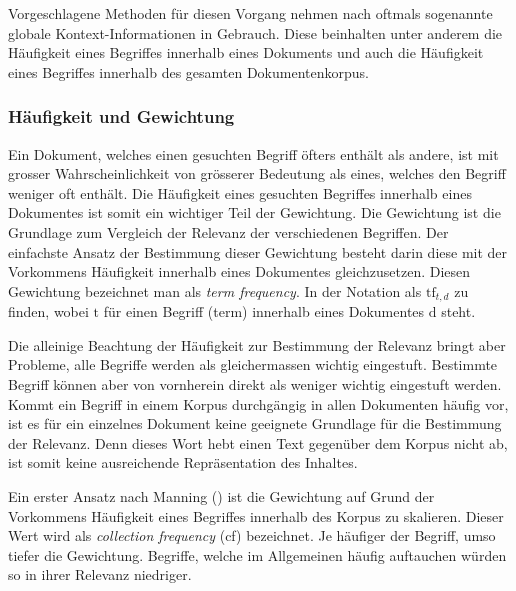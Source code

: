 Vorgeschlagene Methoden für diesen Vorgang nehmen nach \cite[S.~85]{Zhang2006} oftmals sogenannte globale Kontext-Informationen in Gebrauch. Diese beinhalten unter anderem die Häufigkeit eines Begriffes innerhalb eines Dokuments und auch die Häufigkeit eines Begriffes innerhalb des gesamten Dokumentenkorpus. %


\subsubsection{Häufigkeit und Gewichtung}\label{gewichtung}


Ein Dokument, welches einen gesuchten Begriff öfters enthält als andere, ist mit grosser Wahrscheinlichkeit von grösserer Bedeutung als eines, welches den Begriff weniger oft enthält. Die Häufigkeit eines gesuchten Begriffes innerhalb eines Dokumentes ist somit ein wichtiger Teil der Gewichtung. Die Gewichtung ist die Grundlage zum Vergleich der Relevanz der verschiedenen Begriffen. Der einfachste Ansatz der Bestimmung dieser Gewichtung besteht darin diese mit der Vorkommens Häufigkeit innerhalb eines Dokumentes gleichzusetzen. Diesen Gewichtung bezeichnet man als \textit{term frequency}. In der Notation als $\text{tf}_{t,d}$ zu finden, wobei $\text{t}$ für einen Begriff (term) innerhalb eines Dokumentes $\text{d}$ steht.

Die alleinige Beachtung der Häufigkeit zur Bestimmung der Relevanz bringt aber Probleme, alle Begriffe werden als gleichermassen wichtig eingestuft. Bestimmte Begriff können aber von vornherein direkt als weniger wichtig eingestuft werden. Kommt ein Begriff in einem Korpus durchgängig in allen Dokumenten häufig vor, ist es für ein einzelnes Dokument keine geeignete Grundlage für die Bestimmung der Relevanz. Denn dieses Wort hebt einen Text gegenüber dem Korpus nicht ab, ist somit keine ausreichende Repräsentation des Inhaltes.

Ein erster Ansatz nach Manning (\cite{manning2008introduction}) ist die Gewichtung auf Grund der Vorkommens Häufigkeit eines Begriffes innerhalb des Korpus zu skalieren. Dieser Wert wird als \textit{collection frequency} (cf) bezeichnet. Je häuf\-iger der Begriff, umso tiefer die Gewichtung. Begriffe, welche im Allgemeinen häufig auftauchen würden so in ihrer Relevanz niedriger. 

